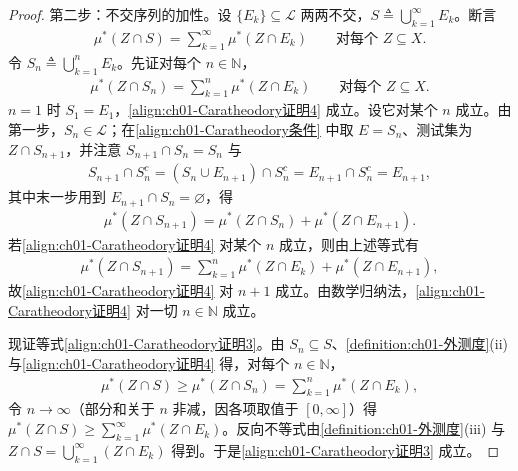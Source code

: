 \documentclass[../../main.tex]{subfiles}%
\begin{document}
\begin{proof}
第二步：不交序列的加性。设 $\{E_k\}\subseteq\mathcal{L}$ 两两不交，$S\triangleq\bigcup_{k=1}^\infty E_k$。断言
\begin{align}
\mu^*(Z\cap S)=\sum_{k=1}^\infty\mu^*(Z\cap E_k)\qquad\text{对每个 }Z\subseteq X.\label{align:ch01-Caratheodory证明3}
\end{align}
令 $S_n\triangleq\bigcup_{k=1}^n E_k$。先证对每个 $n\in\mathbb{N}$，
\begin{align}
\mu^*(Z\cap S_n)=\sum_{k=1}^n\mu^*(Z\cap E_k)\qquad\text{对每个 }Z\subseteq X.\label{align:ch01-Caratheodory证明4}
\end{align}
$n=1$ 时 $S_1=E_1$，\eqref{align:ch01-Caratheodory证明4} 成立。设它对某个 $n$ 成立。由第一步，$S_n\in\mathcal{L}$；在\eqref{align:ch01-Caratheodory条件} 中取 $E=S_n$、测试集为 $Z\cap S_{n+1}$，并注意 $S_{n+1}\cap S_n=S_n$ 与
\begin{align*}
S_{n+1}\cap S_n^c=(S_n\cup E_{n+1})\cap S_n^c=E_{n+1}\cap S_n^c=E_{n+1},
\end{align*}
其中末一步用到 $E_{n+1}\cap S_n=\varnothing$，得
\begin{align*}
\mu^*(Z\cap S_{n+1})=\mu^*(Z\cap S_n)+\mu^*(Z\cap E_{n+1}).
\end{align*}
若\eqref{align:ch01-Caratheodory证明4} 对某个 $n$ 成立，则由上述等式有
\begin{align*}
\mu^*(Z\cap S_{n+1})=\sum_{k=1}^n\mu^*(Z\cap E_k)+\mu^*(Z\cap E_{n+1}),
\end{align*}
故\eqref{align:ch01-Caratheodory证明4} 对 $n+1$ 成立。由数学归纳法，\eqref{align:ch01-Caratheodory证明4} 对一切 $n\in\mathbb{N}$ 成立。

现证等式\eqref{align:ch01-Caratheodory证明3}。由 $S_n\subseteq S$、\cref{definition:ch01-外测度}(ii) 与\eqref{align:ch01-Caratheodory证明4} 得，对每个 $n\in\mathbb{N}$，
\begin{align*}
\mu^*(Z\cap S)\geqslant\mu^*(Z\cap S_n)=\sum_{k=1}^n\mu^*(Z\cap E_k),
\end{align*}
令 $n\to\infty$（部分和关于 $n$ 非减，因各项取值于 $[0,\infty]$）得 $\mu^*(Z\cap S)\geqslant\sum_{k=1}^\infty\mu^*(Z\cap E_k)$。反向不等式由\cref{definition:ch01-外测度}(iii) 与 $Z\cap S=\bigcup_{k=1}^\infty(Z\cap E_k)$ 得到。于是\eqref{align:ch01-Caratheodory证明3} 成立。


\end{proof}
\end{document}
